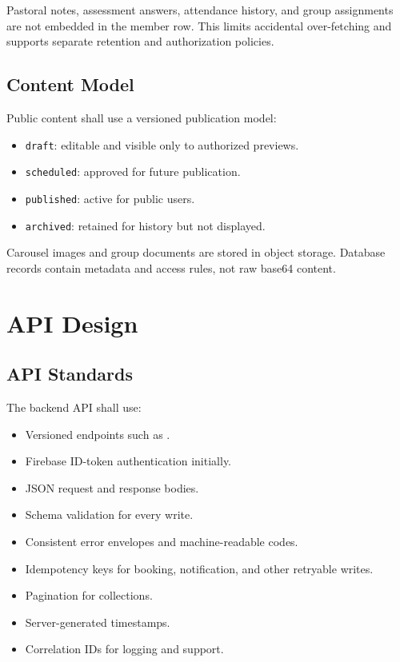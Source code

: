 \documentclass[11pt,a4paper,oneside]{report}
\begin{document}
Pastoral notes, assessment answers, attendance history, and group assignments are not embedded in the member row. This limits accidental over-fetching and supports separate retention and authorization policies.

\section{Content Model}

Public content shall use a versioned publication model:

\begin{itemize}
  \item \texttt{draft}: editable and visible only to authorized previews.
  \item \texttt{scheduled}: approved for future publication.
  \item \texttt{published}: active for public users.
  \item \texttt{archived}: retained for history but not displayed.
\end{itemize}

Carousel images and group documents are stored in object storage. Database records contain metadata and access rules, not raw base64 content.

\chapter{API Design}

\section{API Standards}

The backend API shall use:

\begin{itemize}
  \item Versioned endpoints such as .
  \item Firebase ID-token authentication initially.
  \item JSON request and response bodies.
  \item Schema validation for every write.
  \item Consistent error envelopes and machine-readable codes.
  \item Idempotency keys for booking, notification, and other retryable writes.
  \item Pagination for collections.
  \item Server-generated timestamps.
  \item Correlation IDs for logging and support.
\end{itemize}
\end{document}
